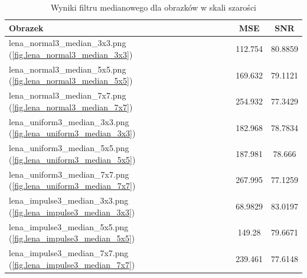 \documentclass{classrep}
\begin{document}
\begin{table}
  \centering
  \begin{tabular}{|l|c|c|}
    \hline
    \textbf{Obrazek} & \textbf{MSE} & \textbf{SNR} \\
    \hline\hline
    lena\_normal3\_median\_3x3.png (\ref{fig.lena_normal3_median_3x3}) & 112.754 & 80.8859 \\ 
    \hline 
    lena\_normal3\_median\_5x5.png (\ref{fig.lena_normal3_median_5x5}) & 169.632 & 79.1121 \\ 
    \hline 
    lena\_normal3\_median\_7x7.png (\ref{fig.lena_normal3_median_7x7}) & 254.932 & 77.3429 \\ 
    \hline 
    lena\_uniform3\_median\_3x3.png (\ref{fig.lena_uniform3_median_3x3}) & 182.968 & 78.7834 \\ 
    \hline 
    lena\_uniform3\_median\_5x5.png (\ref{fig.lena_uniform3_median_5x5}) & 187.981 & 78.666 \\ 
    \hline 
    lena\_uniform3\_median\_7x7.png (\ref{fig.lena_uniform3_median_7x7}) & 267.995 & 77.1259 \\ 
    \hline 
    lena\_impulse3\_median\_3x3.png (\ref{fig.lena_impulse3_median_3x3}) & 68.9829 & 83.0197 \\ 
    \hline 
    lena\_impulse3\_median\_5x5.png (\ref{fig.lena_impulse3_median_5x5}) & 149.28 & 79.6671 \\ 
    \hline 
    lena\_impulse3\_median\_7x7.png (\ref{fig.lena_impulse3_median_7x7}) & 239.461 & 77.6148 \\ 
    \hline 
  \end{tabular}
  \caption{Wyniki filtru medianowego dla obrazków w skali szarości}
  \label{tab.lena_median}
\end{table}

\begin{thebibliography}{99}
\end{thebibliography}
\end{document}

